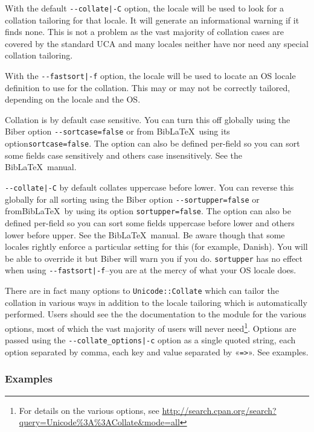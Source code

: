 \documentclass{ltxdockit}
\begin{document}
\noindent With the default \verb+--collate|-C+ option, the locale will
be used to look for a collation tailoring for that locale. It will generate an
informational warning if it finds none. This is not a problem as the vast
majority of collation cases are covered by the standard UCA and many
locales neither have nor need any special collation tailoring.

With the \verb+--fastsort|-f+ option, the locale will be
used to locate an OS locale definition to use for the collation. This
may or may not be correctly tailored, depending on the locale and the OS.

Collation is by default case sensitive. You can turn this
off globally using the Biber option \verb+--sortcase=false+ or from
Bib\LaTeX\ using its option\linebreak[4]\verb+sortcase=false+. The option can also
be defined per-field so you can sort some fields case sensitively and
others case insensitively. See the Bib\LaTeX\ manual.

\verb+--collate|-C+ by default collates uppercase before lower.
You can reverse this globally for all sorting using the Biber option
\verb+--sortupper=false+ or from\linebreak[4]Bib\LaTeX\ by using its option
\verb+sortupper=false+. The option can also be defined per-field so you can
sort some fields uppercase before lower and others lower before upper. See the
Bib\LaTeX\ manual. Be aware though that some locales rightly enforce a
particular setting for this (for example, Danish). You will be able to
override it but Biber will warn you if you do. \verb+sortupper+ has
no effect when using \verb+--fastsort|-f+--you are at the mercy of what
your OS locale does.

There are in fact many options to \verb+Unicode::Collate+
which can tailor the collation in various ways in
addition to the locale tailoring which is automatically performed.
Users should see the the documentation to the module for the various
options, most of which the vast majority of users will never
need\footnote{For details on the various options, see
  \url{http://search.cpan.org/search?query=Unicode\%3A\%3ACollate&mode=all}}.
Options are passed using the \verb+--collate_options|-c+ option as a
single quoted string, each option separated by comma, each key and
value separated by «\verb+=>+». See examples.

\subsubsection{Examples}
\end{document}
